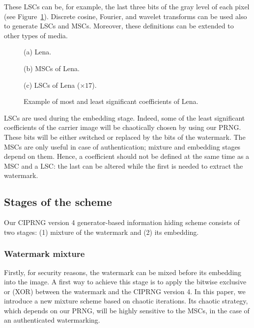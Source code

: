 These LSCs can be, for example, the last three bits of the gray level of each pixel (see Figure~\ref{fig:MSCLC}). Discrete cosine, Fourier, and wavelet transforms can be used also to generate LSCs and MSCs. Moreover, these definitions can be extended to other types of media.




\begin{figure}[htb]

\begin{minipage}[b]{1.0\linewidth}
  \centering
 \centerline{}
  \centerline{(a) Lena.}
\end{minipage}

\begin{minipage}[b]{.48\linewidth}
  \centering
 \centerline{}
  \centerline{(b) MSCs of Lena.}
\end{minipage}
\hfill
\begin{minipage}[b]{0.48\linewidth}
  \centering
 \centerline{}
  \centerline{(c) LSCs of Lena ($\times 17$).}
\end{minipage}
%
\caption{Example of most and least significant coefficients of Lena.}
\label{fig:MSCLC}
%
\end{figure}


LSCs are used during the embedding stage. Indeed, some of the least significant coefficients of the carrier image will be chaotically chosen by using our PRNG. These bits will be either switched or replaced by the bits of the watermark. The MSCs are only useful in case of authentication; mixture and embedding stages depend on them. Hence, a coefficient should not be defined at the same time as a MSC and a LSC: the last can be altered while the first is needed to extract the watermark.
\subsection{Stages of the scheme}

Our CIPRNG version 4 generator-based information hiding scheme consists of two stages: (1) mixture of the watermark and (2) its embedding.

\subsubsection{Watermark mixture}

Firstly, for security reasons, the watermark can be mixed before its embedding into the image. A first way to achieve this stage is to apply the bitwise exclusive or (XOR) between the watermark and the CIPRNG version 4. In this paper, we introduce a new mixture scheme based on chaotic iterations. Its chaotic strategy, which depends on our PRNG, will be highly sensitive to the MSCs, in the case of an authenticated watermarking.%

